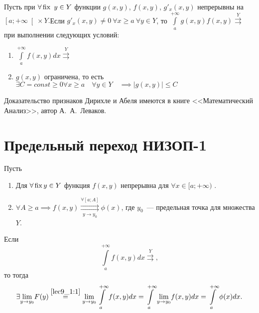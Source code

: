 \documentclass[../../main.tex]{subfiles}
\begin{document}
\begin{thm}

Пусть при $\forall \operatorname{fix} \ y \in Y $ функции $g(x,y)$, $f(x,y)$, $g'_x(x,y)$ 
непрерывны на $\left[a;+\infty\right[\times Y.$Если $ g'_x(x,y) \not = 0\ 
\forall x 
\ge a \ \forall y \in Y $, то $\int\limits_a^{+\infty} g(x,y)f(x,y) 
\overset{Y}{\rightrightarrows}$ при выполнении следующих условий:

\begin{enumerate}
\item $\int\limits_a^{+\infty}f(x,y)dx \overset{Y}{\rightrightarrows}$

\item $g(x,y)$ ограничена, то есть $\exists 
C = 
const \ge 0\forall x \ge a \quad \forall y \in Y 
\quad  \implies \left|g(x,y)\right| \le C $
\end{enumerate}
\end{thm}

Доказательство признаков Дирихле и Абеля имеются в книге <<Математический 
Анализ>>, автор А.~А.~Леваков.


\section{ Предельный переход НИЗОП-1}
\begin{thm}
Пусть

\begin{enumerate}
\item Для $\forall \operatorname{fix}  y \in Y$ функция $f(x,y)$ непрерывна для $\forall x 
\in 
[a;+\infty)$ 
.
\item $\forall A \ge a \implies f(x,y) \overset{\forall [a;A]}{\underset{y \to 
y_0}{\rightrightarrows}} \phi(x) $, где $y_0$~--- 
предельная точка для множества $Y$.
\end{enumerate}

Если \[\int\limits_a^{+\infty}f(x,y)dx \overset{Y}\rightrightarrows, \] то 
тогда 
\begin{equation}\label{lec10:12}
\exists \underset{y \to y_0}\lim F(y) \stk{lec9_1:1}= \underset{y \to 
y_0}\lim\int\limits_a^{+\infty}f(x,y)dx =\int\limits_a^{+\infty} \underset{y 
\to y_0}\lim f(x,y)dx = \int\limits_a^{+\infty}\phi(x)dx. \end{equation}
\end{thm}
\end{document}
